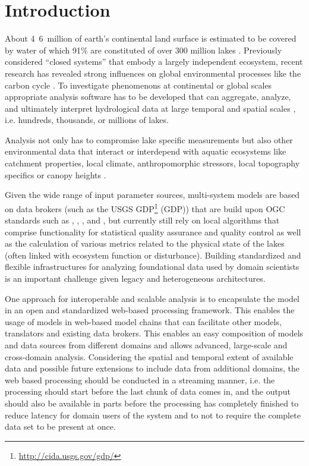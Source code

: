
\chapter{Introduction}

About \unit{4.6 million}{\kilo\square\metre} of earth's continental land surface is estimated to be covered by water of which 91\% are constituted of over 300 million lakes \citep{downing2006global}. Previously considered ``closed systems'' that embody a largely independent ecosystem, recent research has revealed strong influences on global environmental processes like the carbon cycle \citep{cole2007plumbing}. To investigate phenomenons at continental or global scales appropriate analysis software has to be developed that can aggregate, analyze, and ultimately interpret hydrological data at large temporal and spatial scales \citep{read2013upscaling}, i.e. hundreds, thousands, or millions of lakes.

Analysis not only has to compromise lake specific measurements but also other environmental data that interact or interdepend with aquatic ecosystems like catchment properties, local climate, anthropomorphic stressors, local topography specifics or canopy heights \citep{read2013upscaling}.

Given the wide range of input parameter sources, multi-system models are based on data brokers (such as the \ac{USGS} \acl{GDP}\footnote{\url{http://cida.usgs.gov/gdp/}} (\acs{GDP})) that are build upon \ac{OGC} standards such as , , ,  and , but currently still rely on local algorithms that comprise functionality for statistical quality assurance and quality control as well as the calculation of various metrics related to the physical state of the lakes (often linked with ecosystem function or disturbance). Building standardized and flexible infrastructures for analyzing foundational data used by domain scientists is an important challenge given legacy and heterogeneous architectures.

One approach for interoperable and scalable analysis is to encapsulate the model in an open and standardized web-based processing framework. This enables the usage of models in web-based model chains that can facilitate other models, translators and existing data brokers. This enables an easy composition of models and data sources from different domains and allows advanced, large-scale and cross-domain analysis. Considering the spatial and temporal extent of available data and possible future extensions to include data from additional domains, the web based processing should be conducted in a streaming manner, i.e. the processing should start before the last chunk of data comes in, and the output should also be available in parts before the processing has completely finished to reduce latency for domain users of the system and to not to require the complete data set to be present at once.

